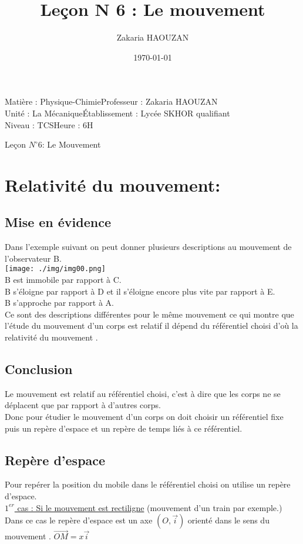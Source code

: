 \documentclass[12pt]{article}
\title{Leçon N 6 : Le mouvement}
\author{Zakaria HAOUZAN}
\date{\today}
\newcommand\headerMe[2]{\noindent{}#1\hfill#2}
\begin{document}
\headerMe{Matière : Physique-Chimie}{Professeur : Zakaria HAOUZAN}\\
\headerMe{Unité : La Mécanique}{Établissement : Lycée SKHOR qualifiant}\\
\headerMe{Niveau : TCS}{Heure : 6H}\\

\begin{center}

    \Large{Leçon $N^{\circ}6$: \color{red}Le Mouvement}
\end{center}

\section{\color{red}Relativité du mouvement:}
\subsection{\color{green}Mise en évidence}
Dans l'exemple suivant on peut donner plusieurs descriptions au mouvement de l'observateur B.\\
\texttt{[image: ./img/img00.png]}\\
B est immobile par rapport à C.\\
B s'éloigne par rapport à D et il s'éloigne encore plus vite par rapport à E.\\
B s'approche par rapport à A.\\
Ce sont des descriptions différentes pour le même mouvement ce qui montre que l'étude du mouvement d'un
corps est relatif il dépend du référentiel choisi d’où la relativité du mouvement .


\subsection{Conclusion}
Le mouvement est relatif au référentiel choisi, c'est à dire que les corps ne se déplacent que par rapport à
d'autres corps.\\
Donc pour étudier le mouvement d'un corps on doit choisir un référentiel fixe puis un repère d'espace et un
repère de temps liés à ce référentiel.

\subsection{Repère d'espace}
Pour repérer la position du mobile dans le référentiel choisi on utilise un repère d'espace.\\
\underline{$1^{er}$ cas : Si le mouvement est rectiligne} (mouvement d'un train par exemple.)\\
Dans ce cas le repère d'espace est un axe $(O, \vec{i})$ orienté dans le sens du mouvement . $\overrightarrow{OM} = x\vec{i}$
\end{document}
